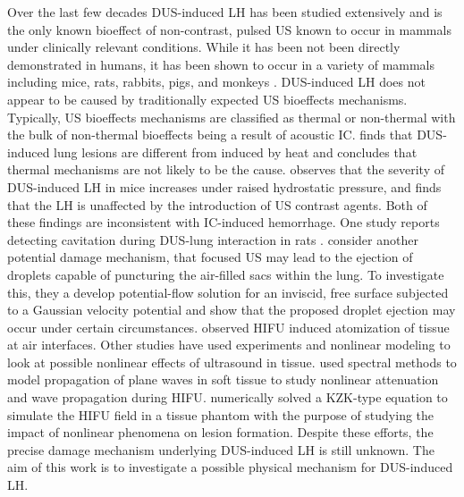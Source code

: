 \documentclass{article}
\begin{document}
Over the last few decades \ac{DUS}-induced \ac{LH} has been studied
extensively and is the only known bioeffect of non-contrast, pulsed
\ac{US} known to occur in mammals under clinically relevant
conditions. While it has been not been directly demonstrated in
humans, it has been shown to occur in a variety of mammals including
mice, rats, rabbits, pigs, and monkeys
\citep{Child1990,OBrien2006a,Tarantal1994a,Miller2012}.
\ac{DUS}-induced \ac{LH} does not appear to be caused by traditionally
expected \ac{US} bioeffects mechanisms. Typically, \ac{US} bioeffects
mechanisms are classified as thermal or non-thermal with the bulk of
non-thermal bioeffects being a result of acoustic
\ac{IC}. \cite{Zachary2006} finds that \ac{DUS}-induced lung lesions
are different from induced by heat and concludes that thermal
mechanisms are not likely to be the cause. \cite{OBrien2000} observes
that the severity of \ac{DUS}-induced \ac{LH} in mice increases under
raised hydrostatic pressure, and \cite{Raeman1996} finds that the
\ac{LH} is unaffected by the introduction of \ac{US} contrast
agents. Both of these findings are inconsistent with \ac{IC}-induced
hemorrhage. One study reports detecting cavitation during
\ac{DUS}-lung interaction in rats \cite{Holland1996}. \cite{Tjan2007}
consider another potential damage mechanism, that focused \ac{US} may
lead to the ejection of droplets capable of puncturing the air-filled
sacs within the lung. To investigate this, they a develop
potential-flow solution for an inviscid, free surface subjected to a
Gaussian velocity potential and show that the proposed droplet
ejection may occur under certain circumstances. \cite{Simon2012}
observed \ac{HIFU} induced atomization of tissue at air
interfaces. Other studies have used experiments and nonlinear modeling
to look at possible nonlinear effects of ultrasound in
tissue. \cite{Khokhlova1997} used spectral methods to model
propagation of plane waves in soft tissue to study nonlinear
attenuation and wave propagation during
\ac{HIFU}. \cite{Khokhlova2005} numerically solved a KZK-type equation
to simulate the \ac{HIFU} field in a tissue phantom with the purpose
of studying the impact of nonlinear phenomena on lesion formation.
Despite these efforts, the precise damage mechanism underlying
\ac{DUS}-induced \ac{LH} is still unknown. The aim of this work is to
investigate a possible physical mechanism for \ac{DUS}-induced
\ac{LH}. 
\end{document}
